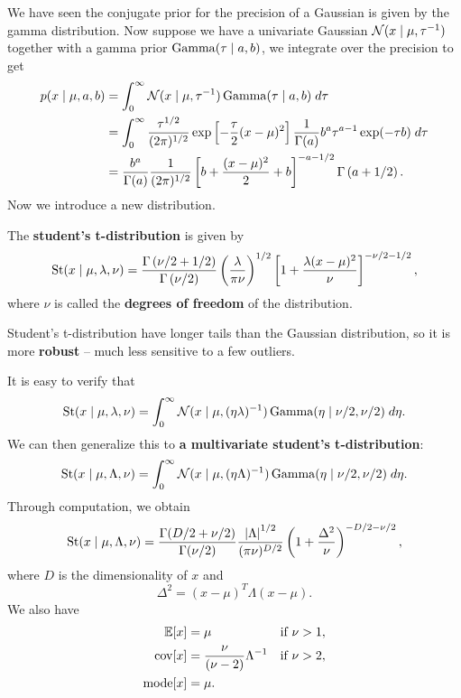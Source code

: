 \documentclass[a4paper]{article}
\begin{document}
We have seen the conjugate prior for the precision 
of a Gaussian is given by the gamma distribution. Now 
suppose we have a univariate Gaussian $\mathcal{N}(x \mid \mu, 
\tau^{-1})$ together with a gamma prior $\operatorname{Gamma} (\tau \mid 
a, b)$, we integrate over the precision to get
\[
\begin{aligned}
p(x \mid \mu, a, b) 
&= \int_0^\infty \mathcal{N}(x \mid \mu, \tau^{-1}) 
\operatorname{Gamma}(\tau \mid a, b) \; d \tau \\
&= \int_0^\infty \frac{\tau^{1 / 2}}{(2 \pi)^{1 / 2}} 
\exp \left[ -\frac{\tau}{2} (x - \mu)^2 \right] 
\frac{1}{\Gamma(a)} b^a \tau^{a - 1} \exp (- \tau b) \; d \tau \\
&= \frac{b^a}{\Gamma(a)} \frac{1}{(2 \pi)^{1 / 2}} 
\left[ b + \frac{(x - \mu)^2}{2} + b \right]^{- a - 1 / 2}
\Gamma \left( a + 1 / 2 \right).
\end{aligned}
\]
Now we introduce a new distribution.
\begin{defi}
The \textbf{student's t-distribution} is given by 
\[
\operatorname{St} (x \mid \mu, \lambda, \nu)
= \frac{\Gamma \left( \nu / 2 + 1 / 2 \right)}
{\Gamma \left( \nu / 2 \right)} 
\left( \frac{\lambda}{\pi \nu} \right)^{1 / 2} 
\left[ 1 + \frac{\lambda (x - \mu)^2}{\nu} \right]^{ - 
\nu / 2 - 1 / 2},
\]
where $\nu$ is called the \textbf{degrees of freedom}
of the distribution.
\end{defi}

Student's t-distribution have longer tails than the 
Gaussian distribution, so it is more \textbf{robust} 
-- much less sensitive to a few outliers.

It is easy to verify that 
\[
\operatorname{St}(x \mid \mu, \lambda, \nu) 
= \int_0^\infty \mathcal{N}(x \mid \mu, (\eta \lambda)^{-1})
\operatorname{Gamma} (\eta \mid \nu / 2, \nu / 2) \; d \eta.
\]
We can then generalize this to \textbf{a multivariate 
student's t-distribution}: 
\[
\operatorname{St} (x \mid \mu, \Lambda, \nu) 
= \int_0^\infty \mathcal{N}(x \mid \mu, (\eta \Lambda)^{-1}) 
\operatorname{Gamma}(\eta \mid \nu / 2, \nu / 2) \; d \eta.
\]
Through computation, we obtain 
\[
\operatorname{St} (x \mid \mu, \Lambda, \nu) 
= \frac{\Gamma(D / 2 + \nu / 2)}{\Gamma(\nu / 2)} 
\frac{\left\lvert \Lambda\right\rvert^{1 / 2}}{(\pi \nu)^{D / 2}}
\left( 1 + \frac{\Delta^2}{\nu} \right)^{- D / 2 - 
\nu / 2},
\]
where $D$ is the dimensionality of $x$ and 
\[
\Delta^2 = (x - \mu)^T \Lambda (x - \mu).
\]
We also have 
\[
\begin{aligned}
  \mathbb{E}[x] &= \mu & \text{if $\nu > 1$}, \\
  \operatorname{cov}[x] &= \frac{\nu}{(\nu - 2)} \Lambda^{-1} 
  & \text{if $\nu > 2$}, \\
  \operatorname{mode}[x] &= \mu.
\end{aligned}
\]
\end{document}

